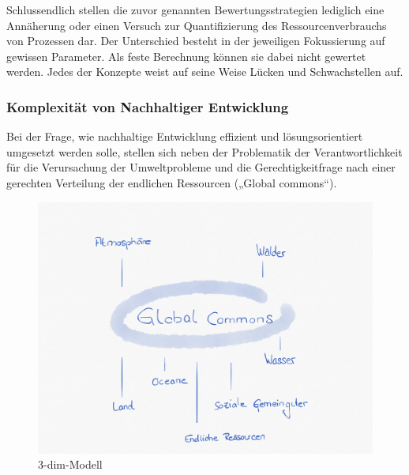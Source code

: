 \documentclass{scrartcl}
\begin{document}
Schlussendlich stellen die zuvor genannten Bewertungsstrategien lediglich eine Annäherung oder einen Versuch zur Quantifizierung des Ressourcenverbrauchs von Prozessen dar. Der Unterschied besteht in der jeweiligen Fokussierung auf gewissen Parameter.  Als feste Berechnung können sie dabei nicht gewertet werden. Jedes der Konzepte weist auf seine Weise Lücken und Schwachstellen auf. 


\subsubsection{Komplexität von Nachhaltiger Entwicklung}
Bei der Frage, wie nachhaltige Entwicklung effizient und lösungsorientiert umgesetzt werden solle, stellen sich neben der Problematik der Verantwortlichkeit für die Verursachung der Umweltprobleme und die Gerechtigkeitfrage nach einer gerechten Verteilung der endlichen Ressourcen („Global commons“). 
\begin{figure}[htbp]
\centering
\includegraphics[width=14cm]{image_folder/globalcommons.png}
\caption{3-dim-Modell}
\label{fig: global commons}
\end{figure}
\end{document}
